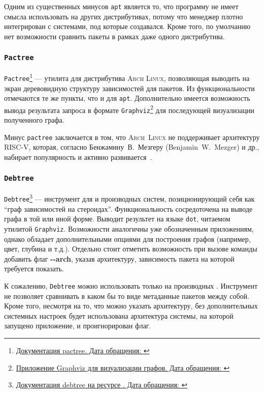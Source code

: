 Одним из существенных минусов \texttt{apt} является то, что программу не имеет смысла использовать на других дистрибутивах, потому что менеджер плотно интегрирован с системами, под которые создавался.
Кроме того, по умолчанию нет возможности сравнить пакеты в рамках даже одного дистрибутива.

\subsubsection{\texttt{Pactree}}
\texttt{Pactree}\footnote{\href{https://man.archlinux.org/man/extra/pacman-contrib/pactree.8.en}{Документация pactree. Дата обращения: }} --- утилита для дистрибутива \textsc{Arch Linux}, позволяющая выводить на экран деревовидную структуру зависимостей для пакетов.
Из функциональности отмечаются те же пункты, что и для \texttt{apt}. Дополнительно имеется возможность вывода результата запроса в формате \texttt{Graphviz}\footnote{\href{https://graphviz.org/}{Приложение Graphviz для визуализации графов. Дата обращения: }} для последующей визуализации полученного графа.

Минус \texttt{pactree} заключается в том, что \textsc{Arch~Linux} не поддерживает архитектуру \textsc{RISC-V}, которая, соглас\-но Бенжамину~В.~Мезгеру (Benjamin~W.~Mezger) и др., набирает популярность и активно развива\-ется~\cite{RISCVSurvey}.

\subsubsection{\texttt{Debtree}}
\texttt{Debtree}\footnote{\href{https://manpages.ubuntu.com/manpages/xenial/man1/debtree.1.html}{Документация debtree на ресурсе {\ubuntu}. Дата обращения: }} --- инструмент для {\debian} и производных систем, позиционирующий себя как ``граф зависимостей на стероидах''. Функциональность сосредоточена на выводе графа в той или иной форме.
Выводит результет на языке \texttt{dot}, читаемом утилитой \texttt{Graphviz}. Возможности аналогичны уже обозначенным приложениям, однако обладает дополнительными опциями для построения графов (например, цвет, глубина и т.д.).
Отдельно стоит отметить возможность при вызове команды добавить флаг \textbf{{-}{-}arch}, указав архитектуру, зависимость пакета на которой требуется показать.

К сожалению, \texttt{Debtree} можно использовать только на производных {\debian}. Инструмент не позволяет сравнивать в каком бы то виде метаданные пакетов между собой.
Кроме того, несмотря на то, что можно указать архитектуру, без дополнительных системных настроек будет использована архитектура системы, на которой запущено приложение, и проигнорирован флаг.

